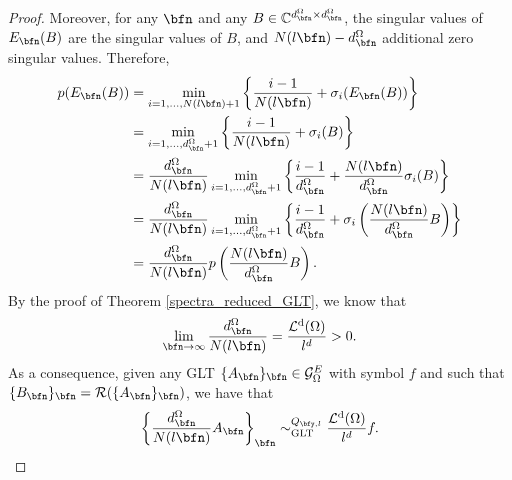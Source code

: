 \documentclass{amsart}
\DeclareMathOperator{\Ld}{\mathcal{L}^d}
\begin{document}
\begin{proof}
    Moreover, for any $\bfn$ and any $B\in\mathbb{C}^{d_\bfn^\Omega\times d_\bfn^\Omega}$, the singular values of $E_\bfn(B)$ are the singular values of $B$, and $N(l\bfn)-d_\bfn^{\Omega}$ additional zero singular values. Therefore,
    \begin{align}\label{iso_red_eq_4}
        p(E_\bfn(B))&=\min\limits_{i=1,\ldots,N(l\bfn)+1}\left\{\frac{i-1}{N(l\bfn)}+\sigma_i(E_\bfn(B))\right\}\\
                \nonumber    &=\min\limits_{i=1,\ldots,d_\bfn^{\Omega}+1}\left\{\frac{i-1}{N(l\bfn)}+\sigma_i(B)\right\}\\
                \nonumber    &=\frac{d_\bfn^{\Omega}}{N(l\bfn)}\min\limits_{i=1,\ldots,d_\bfn^{\Omega}+1}\left\{\frac{i-1}{d_\bfn^{\Omega}}+\frac{N(l\bfn)}{d_\bfn^{\Omega}}\sigma_i(B)\right\}\\
                \nonumber    &=\frac{d_\bfn^{\Omega}}{N(l\bfn)}\min\limits_{i=1,\ldots,d_\bfn^{\Omega}+1}\left\{\frac{i-1}{d_\bfn^{\Omega}}+\sigma_i\left(\frac{N(l\bfn)}{d_\bfn^{\Omega}}B\right)\right\}\\
                \nonumber    &=\frac{d_\bfn^{\Omega}}{N(l\bfn)}p\left(\frac{N(l\bfn)}{d_\bfn^{\Omega}}B\right).
    \end{align}
    By the proof of Theorem \ref{spectra_reduced_GLT}, we know that
    \begin{equation*}
        \lim\limits_{\bfn\to\infty}\frac{d_\bfn^{\Omega}}{N(l\bfn)}=\frac{\Ld(\Omega)}{l^d}>0.
    \end{equation*}
    As a consequence, given any GLT $\{A_\bfn\}_\bfn\in\mathcal{G}_\Omega^E$ with symbol $f$ and such that $\{B_\bfn\}_\bfn=\mathcal{R}(\{A_\bfn\}_\bfn)$, we have that 
    \begin{equation*}
        \left\{\frac{d_\bfn^{\Omega}}{N(l\bfn)}A_\bfn\right\}_\bfn\sim^{Q_{\bfy,l}}_{\mathrm{GLT}}\frac{\Ld(\Omega)}{l^d}f.
    \end{equation*}
    

\end{proof}
\end{document}
